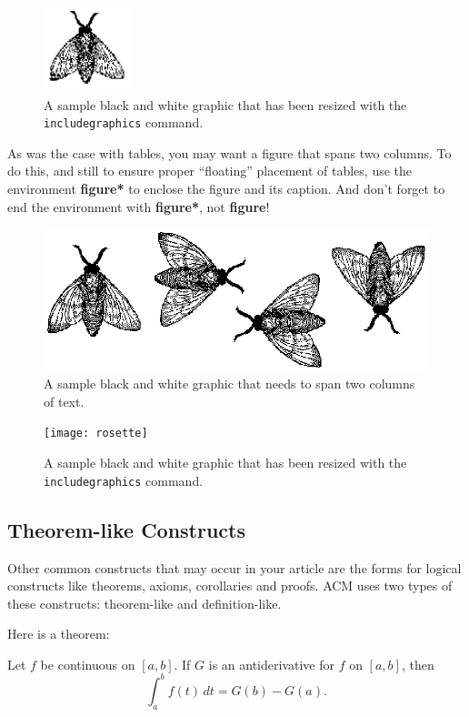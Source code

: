 \begin{figure}
\includegraphics[height=1in, width=1in]{fly}
\caption{A sample black and white graphic
that has been resized with the \texttt{includegraphics} command.}
\end{figure}


As was the case with tables, you may want a figure that spans two
columns.  To do this, and still to ensure proper ``floating''
placement of tables, use the environment \textbf{figure*} to enclose
the figure and its caption.  And don't forget to end the environment
with \textbf{figure*}, not \textbf{figure}!

\begin{figure}
\includegraphics{flies}
\caption{A sample black and white graphic
that needs to span two columns of text.}
\end{figure}


\begin{figure}
\texttt{[image: rosette]}
\caption{A sample black and white graphic that has
been resized with the \texttt{includegraphics} command.}
\end{figure}

\subsection{Theorem-like Constructs}

Other common constructs that may occur in your article are the forms
for logical constructs like theorems, axioms, corollaries and proofs.
ACM uses two types of these constructs:  theorem-like and
definition-like.

Here is a theorem:
\begin{theorem}
  Let $f$ be continuous on $[a,b]$.  If $G$ is
  an antiderivative for $f$ on $[a,b]$, then
  \begin{displaymath}
    \int^b_af(t)\,dt = G(b) - G(a).
  \end{displaymath}
\end{theorem}

